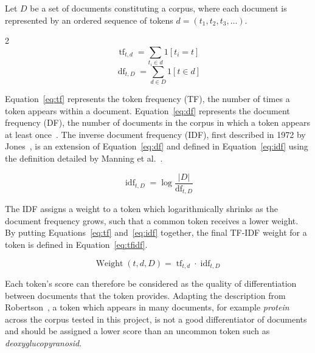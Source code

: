 \documentclass[11pt]{article}
\theoremstyle{plain}
\theoremstyle{definition}
\begin{document}
Let $D$  be a set of documents constituting a corpus, where each document is represented by an ordered sequence of tokens $d = (t_1, t_2, t_3, \dots)$.

\begin{multicols}{2}
    \begin{equation}\label{eq:tf}
        \operatorname{tf}_{t,d} = \sum_{t_i\in d} 1[t_i = t]
    \end{equation}
    \break{}
    \begin{equation}\label{eq:df}
        \operatorname{df}_{t, D} = \sum_{d\in D} 1[t \in d]
    \end{equation}
\end{multicols}

Equation~\ref{eq:tf} represents the token frequency (TF), the number of times a token appears within a document. Equation~\ref{eq:df} represents the document frequency (DF), the number of documents in the corpus in which a token appears at least once~\cite{manning/2008/scoring}. The inverse document frequency (IDF), first described in 1972 by Jones~\cite{jones/1972/statistical}, is an extension of Equation~\ref{eq:df} and defined in Equation~\ref{eq:idf} using the definition detailed by Manning et al.\ \cite{manning/2008/scoring}.

\begin{equation}\label{eq:idf}
    \operatorname{idf}_{t, D} = \log{\frac{|D|}{\operatorname{df}_{t, D}}}
\end{equation}

The IDF assigns a weight to a token which logarithmically shrinks as the document frequency grows, such that a common token receives a lower weight. By putting Equations~\ref{eq:tf} and~\ref{eq:idf} together, the final TF-IDF weight for a token is defined in Equation~\ref{eq:tfidf}.

\begin{equation}\label{eq:tfidf}
    \operatorname{Weight}(t, d, D) = \operatorname{tf}_{t,d} \cdot \operatorname{idf}_{t, D}
\end{equation}

Each token's score can therefore be considered as the quality of differentiation between documents that the token provides. Adapting the description from Robertson~\cite{robertson/2004/understanding}, a token which appears in many documents, for example \textit{protein} across the corpus tested in this project, is not a good differentiator of documents and should be assigned a lower score than an uncommon token such as \textit{deoxyglucopyranosid}.
\end{document}
